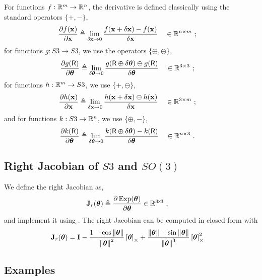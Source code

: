 For functions $f:{\mathbb R}^m\to{\mathbb R}^n$, the derivative is defined classically using the standard operators $\{+,-\}$,
%
\begin{align}\label{equ:derivative_vector}
\frac{\partial f({\bf x})}{\partial{\bf x}} &\triangleq \lim_{\delta{\bf x}\to0}\frac{f({\bf x}+\delta{\bf x})-f({\bf x})}{\delta{\bf x}} &&\in {\mathbb R}^{n\times m} 
~;
\end{align}
%
for functions $g:S3\to S3$, we use the operators $\{\oplus,\ominus\}$,
%
\begin{align}\label{equ:derivative_SO3}
\frac{\partial g(\mathsf R)}{\partial{{\bm \theta}}} 
&\triangleq \lim_{\delta{{\bm \theta}}\to0}\frac{g(\mathsf R\oplus\delta{{\bm \theta}})\ominus g(\mathsf R)}{\delta{{\bm \theta}}}  && \in {\mathbb R}^{3\times 3}
~;
\end{align}
%
for functions $h:{\mathbb R}^m \to S3$, we use $\{+,\ominus\}$,
%
\begin{align}\label{equ:dif_RtoSO3}
\frac{\partial h({\bf x})}{\partial{\bf x}} &\triangleq \lim_{\delta{\bf x}\to0} \frac{ h({\bf x}+\delta{\bf x})\ominus h({\bf x})}{\delta{\bf x}} && \in {\mathbb R}^{3\times m} 
~;
\end{align}
%
and for functions $k:S3\to{\mathbb R}^n$, we use $\{\oplus,-\}$,
%
\begin{align}\label{equ:jacobian_SO3_Rn}
\frac{\partial k(\mathsf R)}{\partial{{\bm \theta}}} &\triangleq \lim_{\delta{{\bm \theta}}\to0} \frac{k(\mathsf R\oplus\delta{{\bm \theta}}) - k(\mathsf R)}{\delta{{\bm \theta}}} && \in {\mathbb R}^{n\times 3} 
~.
\end{align}


\subsection{Right Jacobian of $S3$ and $SO(3)$}

We define the right Jacobian as, 
%
\begin{align}\label{equ:Jr}
{\bf J}_r({{\bm \theta}}) &\triangleq \frac{\partial\operatorname*{Exp}({{\bm \theta}})}{\partial{{\bm \theta}}} 
\in{\mathbb R}^{3\!\times\!3}
~,
\end{align}
%
and implement it using .
The right Jacobian can be computed in closed form  \cite[pag.~40]{CHIRIKJIAN-12} with
%
\begin{align}
{\bf J}_r({{\bm \theta}}) &= {\bf I} - \frac{1-\cos{\left\|{{\bm \theta}}\right\|}}{{\left\|{{\bm \theta}}\right\|}^2}\left[{{\bm \theta}}\right]_\times + \frac{{\left\|{{\bm \theta}}\right\|}-\sin{\left\|{{\bm \theta}}\right\|}}{{\left\|{{\bm \theta}}\right\|}^3}\left[{{\bm \theta}}\right]_\times^2 
\end{align}



\subsection{Examples}


